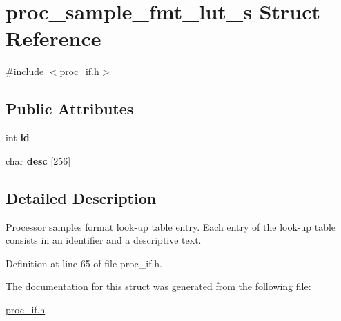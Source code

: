 \hypertarget{structproc__sample__fmt__lut__s}{}\section{proc\+\_\+sample\+\_\+fmt\+\_\+lut\+\_\+s Struct Reference}
\label{structproc__sample__fmt__lut__s}


{\ttfamily \#include $<$proc\+\_\+if.\+h$>$}

\subsection*{Public Attributes}
\begin{DoxyCompactItemize}
\item 
int {\bfseries id}\hypertarget{structproc__sample__fmt__lut__s_a89ce766157fc277f0799dc04d6884ba7}{}\label{structproc__sample__fmt__lut__s_a89ce766157fc277f0799dc04d6884ba7}

\item 
char {\bfseries desc} \mbox{[}256\mbox{]}\hypertarget{structproc__sample__fmt__lut__s_a2473a0886f9617ae93ff35d7d2423220}{}\label{structproc__sample__fmt__lut__s_a2473a0886f9617ae93ff35d7d2423220}

\end{DoxyCompactItemize}


\subsection{Detailed Description}
Processor samples format look-\/up table entry. Each entry of the look-\/up table consists in an identifier and a descriptive text. 

Definition at line 65 of file proc\+\_\+if.\+h.



The documentation for this struct was generated from the following file\+:\begin{DoxyCompactItemize}
\item 
\hyperlink{proc__if_8h}{proc\+\_\+if.\+h}\end{DoxyCompactItemize}
